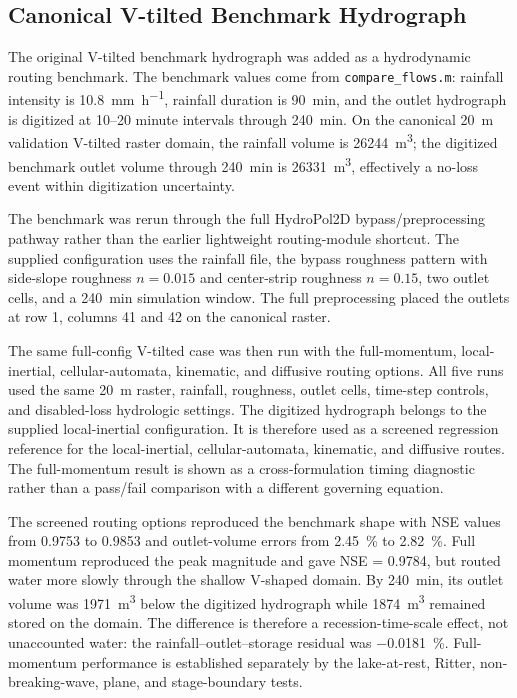 \documentclass[11pt]{article}
\begin{document}
\subsection{Canonical V-tilted Benchmark Hydrograph}
\label{sec:hydro-vtilt-benchmark}
The original V-tilted benchmark hydrograph was added as a hydrodynamic routing benchmark. The benchmark values come from \texttt{compare\_flows.m}: rainfall intensity is \SI{10.8}{\milli\meter\per\hour}, rainfall duration is \SI{90}{\minute}, and the outlet hydrograph is digitized at 10--20 minute intervals through \SI{240}{\minute}. On the canonical \SI{20}{\meter} validation V-tilted raster domain, the rainfall volume is \SI{26244}{\cubic\meter}; the digitized benchmark outlet volume through \SI{240}{\minute} is \SI{26331}{\cubic\meter}, effectively a no-loss event within digitization uncertainty.

The benchmark was rerun through the full HydroPol2D bypass/preprocessing pathway rather than the earlier lightweight routing-module shortcut. The supplied configuration uses the rainfall file, the bypass roughness pattern with side-slope roughness $n=0.015$ and center-strip roughness $n=0.15$, two outlet cells, and a \SI{240}{\minute} simulation window. The full preprocessing placed the outlets at row 1, columns 41 and 42 on the canonical raster.

The same full-config V-tilted case was then run with the full-momentum, local-inertial, cellular-automata, kinematic, and diffusive routing options. All five runs used the same \SI{20}{\meter} raster, rainfall, roughness, outlet cells, time-step controls, and disabled-loss hydrologic settings. The digitized hydrograph belongs to the supplied local-inertial configuration. It is therefore used as a screened regression reference for the local-inertial, cellular-automata, kinematic, and diffusive routes. The full-momentum result is shown as a cross-formulation timing diagnostic rather than a pass/fail comparison with a different governing equation.

The screened routing options reproduced the benchmark shape with NSE values from 0.9753 to 0.9853 and outlet-volume errors from \SI{2.45}{\percent} to \SI{2.82}{\percent}. Full momentum reproduced the peak magnitude and gave NSE = 0.9784, but routed water more slowly through the shallow V-shaped domain. By \SI{240}{\minute}, its outlet volume was \SI{1971}{\cubic\meter} below the digitized hydrograph while \SI{1874}{\cubic\meter} remained stored on the domain. The difference is therefore a recession-time-scale effect, not unaccounted water: the rainfall--outlet--storage residual was \SI{-0.0181}{\percent}. Full-momentum performance is established separately by the lake-at-rest, Ritter, non-breaking-wave, plane, and stage-boundary tests.
\end{document}
